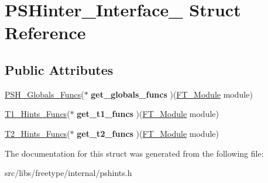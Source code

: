 \hypertarget{struct_p_s_hinter___interface__}{
\section{PSHinter\_\-Interface\_\- Struct Reference}
\label{struct_p_s_hinter___interface__}
}
\subsection*{Public Attributes}
\begin{DoxyCompactItemize}
\item 
\hypertarget{struct_p_s_hinter___interface___a59c68da021c7c0fadcb8bcc8c9a5ba75}{
\hyperlink{struct_p_s_h___globals___funcs_rec__}{PSH\_\-Globals\_\-Funcs}($\ast$ {\bfseries get\_\-globals\_\-funcs} )(\hyperlink{struct_f_t___module_rec__}{FT\_\-Module} module)}
\label{struct_p_s_hinter___interface___a59c68da021c7c0fadcb8bcc8c9a5ba75}

\item 
\hypertarget{struct_p_s_hinter___interface___a9b5405d780efc53df42c3a3e4f8e844b}{
\hyperlink{struct_t1___hints___funcs_rec__}{T1\_\-Hints\_\-Funcs}($\ast$ {\bfseries get\_\-t1\_\-funcs} )(\hyperlink{struct_f_t___module_rec__}{FT\_\-Module} module)}
\label{struct_p_s_hinter___interface___a9b5405d780efc53df42c3a3e4f8e844b}

\item 
\hypertarget{struct_p_s_hinter___interface___a7ecbd2179450d996111ec51e8d50ecc3}{
\hyperlink{struct_t2___hints___funcs_rec__}{T2\_\-Hints\_\-Funcs}($\ast$ {\bfseries get\_\-t2\_\-funcs} )(\hyperlink{struct_f_t___module_rec__}{FT\_\-Module} module)}
\label{struct_p_s_hinter___interface___a7ecbd2179450d996111ec51e8d50ecc3}

\end{DoxyCompactItemize}


The documentation for this struct was generated from the following file:\begin{DoxyCompactItemize}
\item 
src/libs/freetype/internal/pshints.h\end{DoxyCompactItemize}

